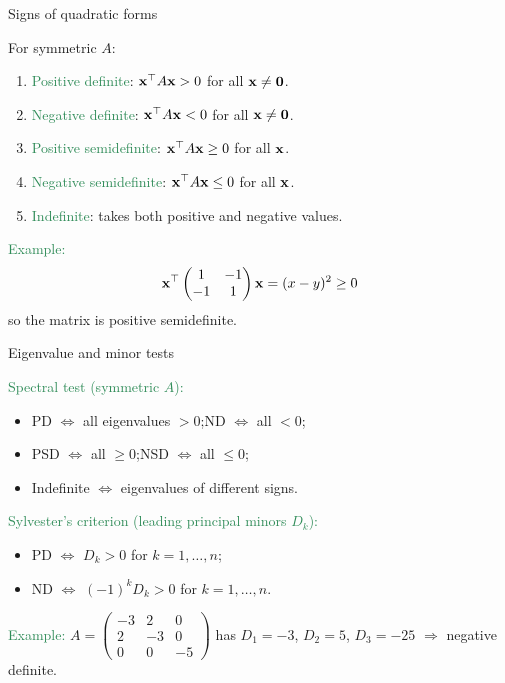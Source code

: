 \documentclass[11pt,aspectratio=169]{beamer}
\begin{document}
\begin{frame}{Signs of quadratic forms}
 
For symmetric $A$:
\begin{enumerate}
\item \textcolor{SeaGreen}{Positive definite}: ${\bf x}^\top  A{\bf x}>0$ for all ${\bf x}\ne{\bf 0}$.
\item \textcolor{SeaGreen}{Negative definite}: ${\bf x}^\top  A{\bf x}<0$ for all ${\bf x}\ne{\bf 0}$.
\item \textcolor{SeaGreen}{Positive semidefinite}: ${\bf x}^\top  A{\bf x}\ge 0$ for all ${\bf x}$.
\item \textcolor{SeaGreen}{Negative semidefinite}: ${\bf x}^\top  A{\bf x}\le 0$ for all ${\bf x}$.
\item \textcolor{SeaGreen}{Indefinite}: takes both positive and negative values.
\end{enumerate}
\textcolor{SeaGreen}{Example:}
\[
{\bf x}^\top 
\begin{pmatrix}1&-1\\ -1&1\end{pmatrix}
{\bf x}=(x-y)^2\ge 0
\]
so the matrix is positive semidefinite.
 
\end{frame}

\begin{frame}{Eigenvalue and minor tests}
 
\textcolor{SeaGreen}{Spectral test (symmetric $A$):}
\begin{itemize}
\item PD $\Longleftrightarrow$ all eigenvalues $>0$;\quad ND $\Longleftrightarrow$ all $<0$;
\item PSD $\Longleftrightarrow$ all $\ge 0$;\quad NSD $\Longleftrightarrow$ all $\le 0$;
\item Indefinite $\Longleftrightarrow$ eigenvalues of different signs.
\end{itemize}
\textcolor{SeaGreen}{Sylvester’s criterion (leading principal minors $D_k$):}
\begin{itemize}
\item PD $\Longleftrightarrow$ $D_k>0$ for $k=1,\ldots,n$;
\item ND $\Longleftrightarrow$ $(-1)^kD_k>0$ for $k=1,\ldots,n$.
\end{itemize}
\textcolor{SeaGreen}{Example:}
\(
A=\begin{pmatrix}-3&2&0\\ 2&-3&0\\ 0&0&-5\end{pmatrix}
\)
has $D_1=-3$, $D_2=5$, $D_3=-25$ $\Rightarrow$ negative definite.
 
\end{frame}
\end{document}
